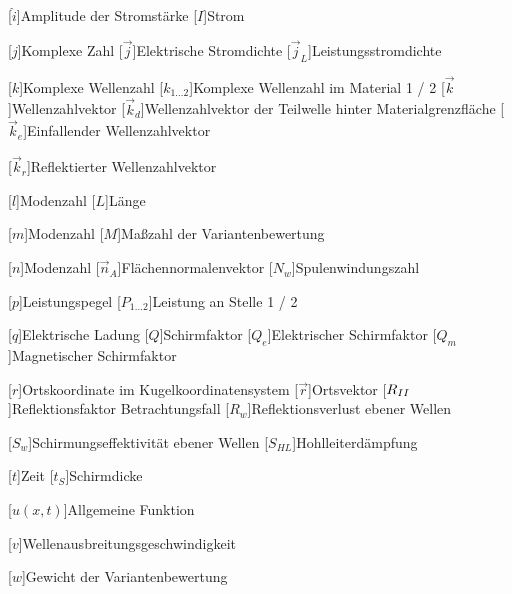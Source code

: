 \begin{acronym}[Platzhalterwort]
[$\hat i$]{\acrounit{\ampere}Amplitude der Stromstärke}
[$I$]{\acrounit{\ampere}Strom}

[$j$]{\acrounit{-}Komplexe Zahl}
[$\vec j$]{\acrounit{\ampere\per\square\meter}Elektrische Stromdichte}
[$\vec j_L$]{\acrounit{\ampere\per\square\meter}Leistungsstromdichte}

[$k$]{\acrounit{-}Komplexe Wellenzahl}
[$k_{1\ldots2}$]{\acrounit{-}Komplexe Wellenzahl im Material 1 / 2}
[$\vec k$]{\acrounit{-}Wellenzahlvektor}
[$\vec k_d$]{\acrounit{-}Wellenzahlvektor der Teilwelle hinter Materialgrenzfläche}
[$\vec k_e$]{\acrounit{-}Einfallender Wellenzahlvektor}

[$\vec k_r$]{\acrounit{-}Reflektierter Wellenzahlvektor}

[$l$]{Modenzahl}
[$L$]{\acrounit{\meter}Länge}

[$m$]{Modenzahl}
[$M$]{\acrounit{-}Maßzahl der Variantenbewertung}

[$n$]{Modenzahl}
[$\vec n_A$]{Flächennormalenvektor}
[$N_w$]{Spulenwindungszahl}

[$p$]{\acrounit{\Dezibel}Leistungspegel}
[$P_{1\ldots2}$]{\acrounit{\watt}Leistung an Stelle 1 / 2}

[$q$]{\acrounit{\ampere\second}Elektrische Ladung}
[$Q$]{\acrounit{-}Schirmfaktor}
[$Q_e$]{\acrounit{-}Elektrischer Schirmfaktor}
[$Q_m$]{\acrounit{-}Magnetischer Schirmfaktor}

[$r$]{\acrounit{-}Ortskoordinate im Kugelkoordinatensystem}
[$\vec r$]{Ortsvektor}
[$R_{\uproman{2}}$]{Reflektionsfaktor Betrachtungsfall }
[$R_w$]{\acrounit{\Dezibel}Reflektionsverlust ebener Wellen}

[$S_w$]{\acrounit{\Dezibel}Schirmungseffektivität ebener Wellen}
[$S_{HL}$]{\acrounit{\Dezibel}Hohlleiterdämpfung}

[$t$]{\acrounit{\second}Zeit}
[$t_S$]{\acrounit{\meter}Schirmdicke}

[$u(x,t)$]{\acrounit{-}Allgemeine Funktion}

[$v$]{\acrounit{\meter\per\second}Wellenausbreitungsgeschwindigkeit}

[$w$]{\acrounit{-}Gewicht der Variantenbewertung}


\end{acronym}
